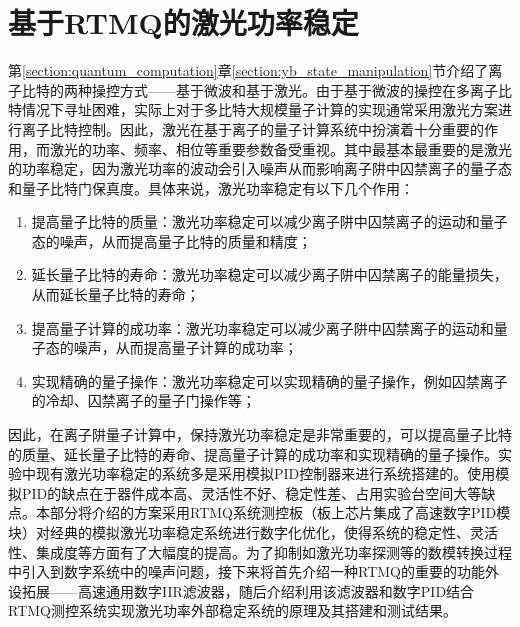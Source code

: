 \section[基于RTMQ的激光功率稳定]{基于RTMQ的激光功率稳定\label{section:laser_power_locking}}
第\ref{section:quantum_computation}章\ref{section:yb_state_manipulation}节介绍了离子比特的两种操控方式——基于微波和基于激光。由于基于微波的操控在多离子比特情况下寻址困难，实际上对于多比特大规模量子计算的实现通常采用激光方案进行离子比特控制。因此，激光在基于离子的量子计算系统中扮演着十分重要的作用，而激光的功率、频率、相位等重要参数备受重视。其中最基本最重要的是激光的功率稳定，因为激光功率的波动会引入噪声从而影响离子阱中囚禁离子的量子态和量子比特门保真度\cite[]{Blums_Scarabel_Shimizu_Ghadimi_Connell_Händel_Norton_Bridge_Kielpinski_Lobino_et_al_2020}。具体来说，激光功率稳定有以下几个作用：
\begin{enumerate}
    \item 提高量子比特的质量：激光功率稳定可以减少离子阱中囚禁离子的运动和量子态的噪声，从而提高量子比特的质量和精度；
    \item 延长量子比特的寿命：激光功率稳定可以减少离子阱中囚禁离子的能量损失，从而延长量子比特的寿命；
    \item 提高量子计算的成功率：激光功率稳定可以减少离子阱中囚禁离子的运动和量子态的噪声，从而提高量子计算的成功率；
    \item 实现精确的量子操作：激光功率稳定可以实现精确的量子操作，例如囚禁离子的冷却、囚禁离子的量子门操作等；
\end{enumerate}

因此，在离子阱量子计算中，保持激光功率稳定是非常重要的，可以提高量子比特的质量、延长量子比特的寿命、提高量子计算的成功率和实现精确的量子操作。实验中现有激光功率稳定的系统多是采用模拟PID控制器来进行系统搭建的。使用模拟PID的缺点在于器件成本高、灵活性不好、稳定性差、占用实验台空间大等缺点。本部分将介绍的方案采用RTMQ系统测控板（板上芯片集成了高速数字PID模块）对经典的模拟激光功率稳定系统进行数字化优化，使得系统的稳定性、灵活性、集成度等方面有了大幅度的提高。为了抑制如激光功率探测等的数模转换过程中引入到数字系统中的噪声问题，接下来将首先介绍一种RTMQ的重要的功能外设拓展——高速通用数字IIR滤波器，随后介绍利用该滤波器和数字PID结合RTMQ测控系统实现激光功率外部稳定系统的原理及其搭建和测试结果。

